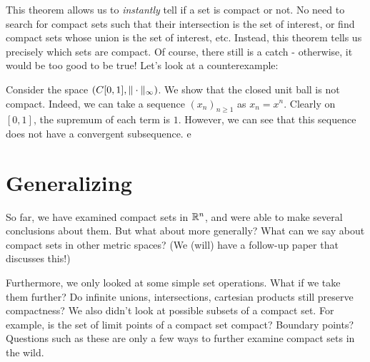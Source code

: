\documentclass{article}
\begin{document}
This theorem allows us to \textit{instantly} tell if a set is compact or not.
No need to search for compact sets such that their intersection is the set of interest, or find
compact sets whose union is the set of interest, etc.
Instead, this theorem tells us precisely which sets are compact. \vsp
%
Of course, there still is a catch - otherwise, it would be too good to be true!
Let's look at a counterexample:

\begin{xmp}
    Consider the space $ (C[0,1], \|\cdot\|_{\infty}) $.
    We show that the closed unit ball is not compact. \vsp
    Indeed, we can take a sequence $ (x_{n})_{n\geq1} $ as $ x_{n} = x^{n} $.
    Clearly on $ [0, 1] $, the supremum of each term is $ 1 $.
    However, we can see that this sequence does not have a convergent subsequence. \vsp
    e
\end{xmp}

\section{Generalizing}

So far, we have examined compact sets in $ \mathbb{R}^{n} $, and were able to make several conclusions
about them. But what about more generally? What can we say about compact sets in other
metric spaces? (We (will) have a follow-up paper that discusses this!) \npgh

Furthermore, we only looked at some simple set operations.
What if we take them further? Do infinite unions, intersections, cartesian products still
preserve compactness? We also didn't look at possible subsets of a compact set.
For example, is the set of limit points of a compact set compact? Boundary points?
Questions such as these are only a few ways to further examine compact sets in the wild.
\end{document}
